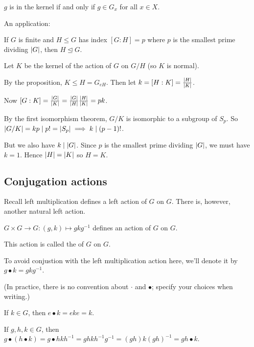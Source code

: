 \documentclass[12pt,letterpaper]{report}
\begin{document}
\begin{thmproof}
  $g$ is in the kernel if and only if $g \in G_x$ for all $x \in X$.
\end{thmproof}

An application:

\begin{thm}{}{}
  If $G$ is finite and $H \leq G$ has index $[G : H] = p$ where $p$ is the smallest prime dividing
  $\lvert G\rvert$, then $H \trianglelefteq G$.
\end{thm}

\begin{thmproof}
  Let $K$ be the kernel of the action of $G$ on $G/H$ (so $K$ is normal).

  By the proposition, $K \leq H = G_{eH}$.
  Then let $k = [H : K] = \frac{\lvert H\rvert}{\lvert K\rvert}$.

  Now $[G : K] = \frac{\lvert G\rvert}{\lvert K\rvert} = \frac{\lvert G\rvert}{\lvert H\rvert} \frac{\lvert H\rvert}{\lvert K\rvert} = pk$.

  By the first isomorphism theorem, $G/K$ is isomorphic to a subgroup of $S_p$.
  So $\lvert G/K\rvert = kp \mid p! = \lvert S_p\rvert \implies k \mid (p - 1)!$.

  But we also have $k \mid \lvert G\rvert$.
  Since $p$ is the smallest prime dividing $\lvert G\rvert$, we must have $k = 1$.
  Hence $\lvert H\rvert = \lvert K\rvert$ so $H = K$.
\end{thmproof}

\pagebreak
\subsection{Conjugation actions}

Recall left multiplication defines a left action of $G$ on $G$.
There is, however, another natural left action.

\begin{lem}{}{}
  $G \times G \to G : (g, k) \mapsto gkg^{-1}$ defines an action of $G$ on $G$.
\end{lem}

This action is called the  of $G$ on $G$.

To avoid conjustion with the left multiplication action here, we'll denote it by
$g \bullet k = gkg^{-1}$.

(In practice, there is no convention about $\cdot$ and $\bullet$; specify your choices when
writing.)

\begin{thmproof}
  If $k \in G$, then $e \bullet k = eke = k$.

  If $g, h, k \in G$, then
  $g \bullet (h \bullet k) = g \bullet hkh^{-1} = ghkh^{-1}g^{-1} = (gh)k(gh)^{-1} = gh \bullet k$.
\end{thmproof}
\end{document}
